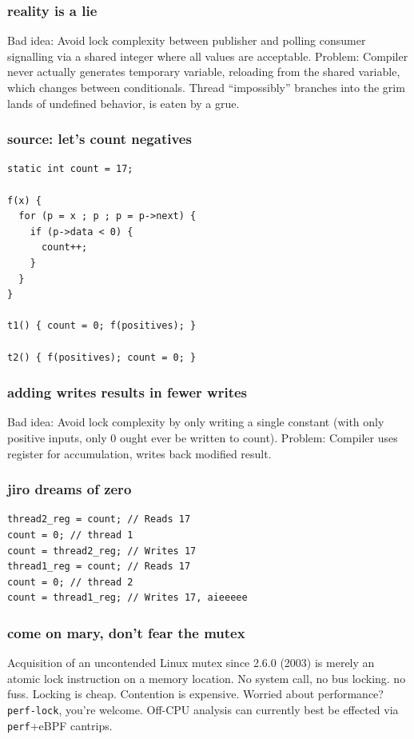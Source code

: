 \documentclass{beamer}
\begin{document}
\begin{frame}
\frametitle{reality is a lie}
Bad idea: Avoid lock complexity between publisher and polling consumer signalling via a shared integer where all values are acceptable.
\vfill
Problem: Compiler never actually generates temporary variable, reloading from the shared variable, which changes between conditionals. Thread ``impossibly'' branches into the grim lands of undefined behavior, is eaten by a grue.
\end{frame}

\begin{frame}[fragile]
\frametitle{source: let's count negatives}
\begin{lstlisting}
static int count = 17;

f(x) {
  for (p = x ; p ; p = p->next) {
    if (p->data < 0) {
      count++;
    }
  }
}

t1() { count = 0; f(positives); }

t2() { f(positives); count = 0; }
\end{lstlisting}
\end{frame}

\begin{frame}
\frametitle{adding writes results in fewer writes}
Bad idea: Avoid lock complexity by only writing a single constant (with only positive inputs, only 0 ought ever be written to count).
\vfill
Problem: Compiler uses register for accumulation, writes back modified result.
\end{frame}

\begin{frame}[fragile]
\frametitle{jiro dreams of zero}
\begin{lstlisting}
thread2_reg = count; // Reads 17
count = 0; // thread 1
count = thread2_reg; // Writes 17
thread1_reg = count; // Reads 17
count = 0; // thread 2
count = thread1_reg; // Writes 17, aieeeee
\end{lstlisting}
\end{frame}

\begin{frame}
\frametitle{come on mary, don't fear the mutex}
Acquisition of an uncontended Linux mutex since 2.6.0 (2003) is merely an
atomic lock instruction on a memory location. No system call, no bus locking.
no fuss.
\vfill
Locking is cheap. Contention is expensive.
\vfill
Worried about performance? \texttt{perf-lock}, you're welcome. Off-CPU analysis
can currently best be effected via \texttt{perf}+eBPF cantrips.
\end{frame}
\end{document}
